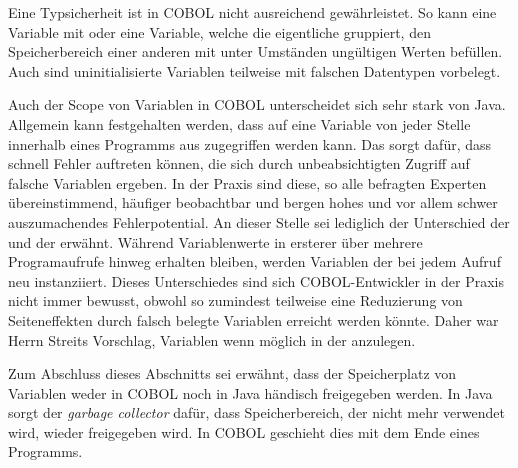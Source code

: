 Eine Typsicherheit ist in COBOL nicht ausreichend gewährleistet. So kann eine Variable mit  oder eine Variable, welche die eigentliche gruppiert, den Speicherbereich einer anderen mit unter Umständen ungültigen Werten befüllen. Auch sind uninitialisierte Variablen teilweise mit falschen Datentypen vorbelegt. 

Auch der Scope von Variablen in COBOL unterscheidet sich sehr stark von Java. Allgemein kann festgehalten werden, dass auf eine Variable von jeder Stelle innerhalb eines Programms aus zugegriffen werden kann. Das sorgt dafür, dass schnell Fehler auftreten können, die sich durch unbeabsichtigten Zugriff auf falsche Variablen ergeben. In der Praxis sind diese, so alle befragten Experten übereinstimmend, häufiger beobachtbar und bergen hohes und vor allem schwer auszumachendes Fehlerpotential. An dieser Stelle sei lediglich der Unterschied der  und der  erwähnt. Während Variablenwerte in ersterer über mehrere Programaufrufe hinweg erhalten bleiben, werden Variablen der  bei jedem Aufruf neu instanziiert. Dieses Unterschiedes sind sich COBOL-Entwickler in der Praxis nicht immer bewusst, obwohl so zumindest teilweise eine Reduzierung von Seiteneffekten durch falsch belegte Variablen erreicht werden könnte. Daher war Herrn Streits Vorschlag, Variablen wenn möglich in der  anzulegen.

Zum Abschluss dieses Abschnitts sei erwähnt, dass der Speicherplatz von Variablen weder in COBOL noch in Java händisch freigegeben werden. In Java sorgt der \textit{garbage collector} dafür, dass Speicherbereich, der nicht mehr verwendet wird, wieder freigegeben wird. In COBOL geschieht dies mit dem Ende eines Programms. 